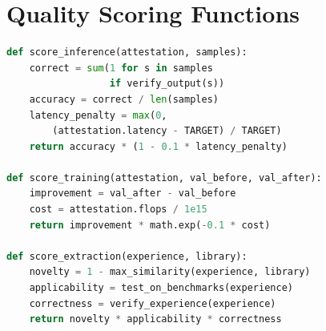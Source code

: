 \section{Quality Scoring Functions}


\begin{lstlisting}[language=python,caption=Quality Scoring Implementation]
def score_inference(attestation, samples):
    correct = sum(1 for s in samples
                  if verify_output(s))
    accuracy = correct / len(samples)
    latency_penalty = max(0,
        (attestation.latency - TARGET) / TARGET)
    return accuracy * (1 - 0.1 * latency_penalty)

def score_training(attestation, val_before, val_after):
    improvement = val_after - val_before
    cost = attestation.flops / 1e15
    return improvement * math.exp(-0.1 * cost)

def score_extraction(experience, library):
    novelty = 1 - max_similarity(experience, library)
    applicability = test_on_benchmarks(experience)
    correctness = verify_experience(experience)
    return novelty * applicability * correctness
\end{lstlisting}

